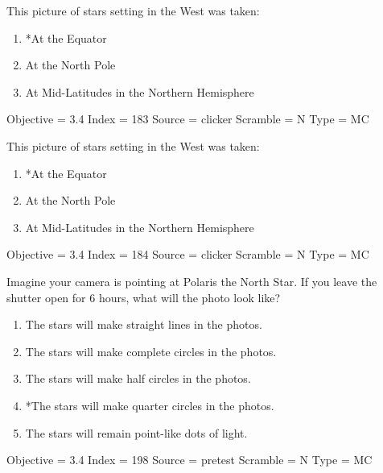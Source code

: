 \documentclass[11pt]{article}
\begin{document}
\begin{enumerate}
\begin{minipage}{\textwidth}
\begin{minipage}{\textwidth}
\item This picture of stars setting in the West was taken:
\begin{enumerate} 
\setlength{\itemsep}{1pt} 
\setlength{\parskip}{0pt} 
\setlength{\parsep}{0pt}
\setlength{\multicolsep}{1pt} 
\item *At the Equator
\item At the North Pole
\item At Mid-Latitudes in the Northern Hemisphere
\end{enumerate} 
Objective = 3.4
Index = 183
Source = clicker
Scramble = N
Type = MC
\end{minipage}
\end{minipage}
\vskip 0.20in

\begin{minipage}{\textwidth}
\begin{minipage}{\textwidth}
\item This picture of stars setting in the West was taken:
\begin{enumerate} 
\setlength{\itemsep}{1pt} 
\setlength{\parskip}{0pt} 
\setlength{\parsep}{0pt}
\setlength{\multicolsep}{1pt} 
\item *At the Equator
\item At the North Pole
\item At Mid-Latitudes in the Northern Hemisphere
\end{enumerate} 
Objective = 3.4
Index = 184
Source = clicker
Scramble = N
Type = MC
\end{minipage}
\end{minipage}
\vskip 0.20in

\begin{minipage}{\textwidth}
\begin{minipage}{\textwidth}
\item Imagine your camera is pointing at Polaris the North Star.  If you leave the shutter open for 6 hours, what will the photo look like?
\begin{enumerate} 
\setlength{\itemsep}{1pt} 
\setlength{\parskip}{0pt} 
\setlength{\parsep}{0pt}
\setlength{\multicolsep}{1pt} 
\item The stars will make straight lines in the photos.
\item The stars will make complete circles in the photos.
\item The stars will make half circles in the photos.
\item *The stars will make quarter circles in the photos.
\item The stars will remain point-like dots of light.
\end{enumerate} 
Objective = 3.4
Index = 198
Source = pretest
Scramble = N
Type = MC
\end{minipage}
\end{minipage}
\vskip 0.20in


\end{enumerate}
\end{document}
